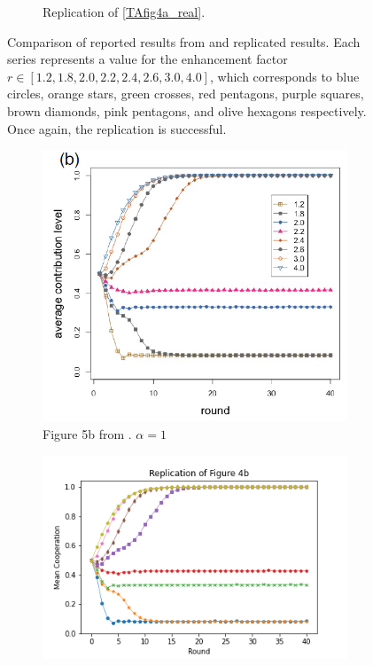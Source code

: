 \begin{figure}[!h]
\begin{subfigure}[b]{0.45\textwidth}
    \caption{Replication of \ref{TAfig4a_real}. }
    \label{TAfig4a}
  \end{subfigure}
  \caption{Comparison of reported results from \cite{RN49} and replicated results. Each series represents a value for the enhancement factor $r \in [1.2, 1.8, 2.0, 2.2, 2.4, 2.6, 3.0, 4.0]$, which corresponds to blue circles, orange stars, green crosses, red pentagons, purple squares, brown diamonds, pink pentagons, and olive hexagons respectively. Once again, the replication is successful. } \label{comp1}
\end{figure} 
\FloatBarrier




\FloatBarrier
\begin{figure}[!h] 
  \begin{subfigure}[b]{0.45\textwidth}
    \includegraphics[width=\textwidth]{images/TAfig4b_real.png}
    \caption{Figure 5b from \cite{RN49}. $\alpha = 1$ }
    \label{TAfig4b_real}
  \end{subfigure}
  \hfill
  \begin{subfigure}[b]{0.45\textwidth}
    \includegraphics[width=1.35\textwidth]{images/TAfig4b.png}

\end{subfigure}
\end{figure}
